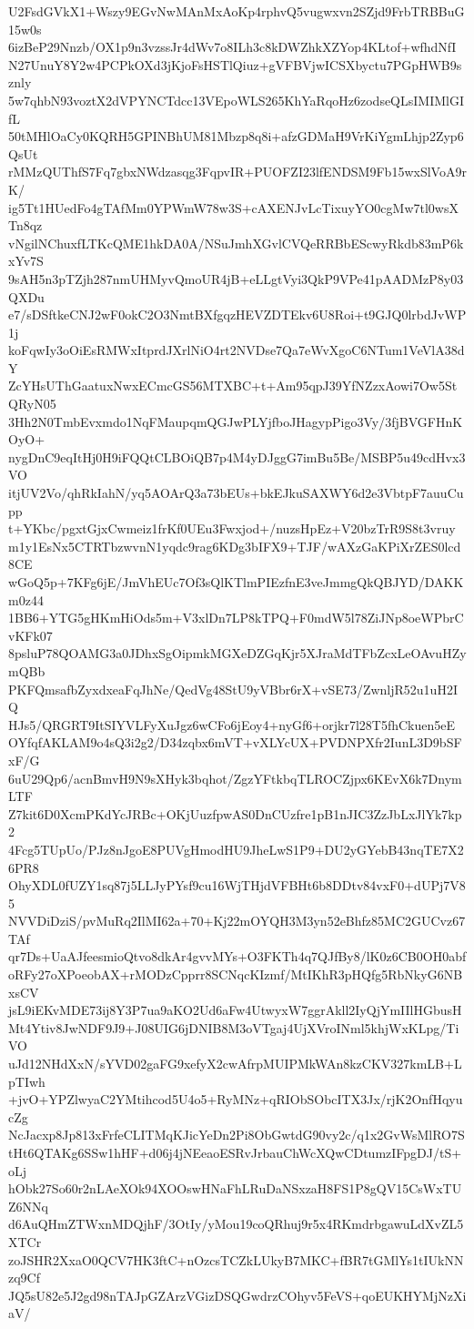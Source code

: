 U2FsdGVkX1+Wszy9EGvNwMAnMxAoKp4rphvQ5vugwxvn2SZjd9FrbTRBBuG15w0s
6izBeP29Nnzb/OX1p9n3vzssJr4dWv7o8ILh3c8kDWZhkXZYop4KLtof+wfhdNfI
N27UnuY8Y2w4PCPkOXd3jKjoFsHSTlQiuz+gVFBVjwICSXbyctu7PGpHWB9sznly
5w7qhbN93voztX2dVPYNCTdcc13VEpoWLS265KhYaRqoHz6zodseQLsIMIMlGIfL
50tMHlOaCy0KQRH5GPINBhUM81Mbzp8q8i+afzGDMaH9VrKiYgmLhjp2Zyp6QsUt
rMMzQUThfS7Fq7gbxNWdzasqg3FqpvIR+PUOFZI23lfENDSM9Fb15wxSlVoA9rK/
ig5Tt1HUedFo4gTAfMm0YPWmW78w3S+cAXENJvLcTixuyYO0cgMw7tl0wsXTn8qz
vNgilNChuxfLTKcQME1hkDA0A/NSuJmhXGvlCVQeRRBbEScwyRkdb83mP6kxYv7S
9sAH5n3pTZjh287nmUHMyvQmoUR4jB+eLLgtVyi3QkP9VPe41pAADMzP8y03QXDu
e7/sDSftkeCNJ2wF0okC2O3NmtBXfgqzHEVZDTEkv6U8Roi+t9GJQ0lrbdJvWP1j
koFqwIy3oOiEsRMWxItprdJXrlNiO4rt2NVDse7Qa7eWvXgoC6NTum1VeVlA38dY
ZcYHsUThGaatuxNwxECmcGS56MTXBC+t+Am95qpJ39YfNZzxAowi7Ow5StQRyN05
3Hh2N0TmbEvxmdo1NqFMaupqmQGJwPLYjfboJHagypPigo3Vy/3fjBVGFHnKOyO+
nygDnC9eqItHj0H9iFQQtCLBOiQB7p4M4yDJggG7imBu5Be/MSBP5u49cdHvx3VO
itjUV2Vo/qhRkIahN/yq5AOArQ3a73bEUs+bkEJkuSAXWY6d2e3VbtpF7auuCupp
t+YKbc/pgxtGjxCwmeiz1frKf0UEu3Fwxjod+/nuzsHpEz+V20bzTrR9S8t3vruy
m1y1EsNx5CTRTbzwvnN1yqdc9rag6KDg3bIFX9+TJF/wAXzGaKPiXrZES0lcd8CE
wGoQ5p+7KFg6jE/JmVhEUc7Of3sQlKTlmPIEzfnE3veJmmgQkQBJYD/DAKKm0z44
1BB6+YTG5gHKmHiOds5m+V3xlDn7LP8kTPQ+F0mdW5l78ZiJNp8oeWPbrCvKFk07
8psluP78QOAMG3a0JDhxSgOipmkMGXeDZGqKjr5XJraMdTFbZcxLeOAvuHZymQBb
PKFQmsafbZyxdxeaFqJhNe/QedVg48StU9yVBbr6rX+vSE73/ZwnljR52u1uH2IQ
HJs5/QRGRT9ItSIYVLFyXuJgz6wCFo6jEoy4+nyGf6+orjkr7l28T5fhCkuen5eE
OYfqfAKLAM9o4sQ3i2g2/D34zqbx6mVT+vXLYcUX+PVDNPXfr2IunL3D9bSFxF/G
6uU29Qp6/acnBmvH9N9sXHyk3bqhot/ZgzYFtkbqTLROCZjpx6KEvX6k7DnymLTF
Z7kit6D0XcmPKdYcJRBc+OKjUuzfpwAS0DnCUzfre1pB1nJIC3ZzJbLxJlYk7kp2
4Fcg5TUpUo/PJz8nJgoE8PUVgHmodHU9JheLwS1P9+DU2yGYebB43nqTE7X26PR8
OhyXDL0fUZY1sq87j5LLJyPYsf9cu16WjTHjdVFBHt6b8DDtv84vxF0+dUPj7V85
NVVDiDziS/pvMuRq2IlMI62a+70+Kj22mOYQH3M3yn52eBhfz85MC2GUCvz67TAf
qr7Ds+UaAJfeesmioQtvo8dkAr4gvvMYs+O3FKTh4q7QJfBy8/lK0z6CB0OH0abf
oRFy27oXPoeobAX+rMODzCpprr8SCNqcKIzmf/MtIKhR3pHQfg5RbNkyG6NBxsCV
jsL9iEKvMDE73ij8Y3P7ua9aKO2Ud6aFw4UtwyxW7ggrAkll2IyQjYmIIlHGbusH
Mt4Ytiv8JwNDF9J9+J08UIG6jDNIB8M3oVTgaj4UjXVroINml5khjWxKLpg/TiVO
uJd12NHdXxN/sYVD02gaFG9xefyX2cwAfrpMUIPMkWAn8kzCKV327kmLB+LpTIwh
+jvO+YPZlwyaC2YMtihcod5U4o5+RyMNz+qRIObSObcITX3Jx/rjK2OnfHqyucZg
NcJacxp8Jp813xFrfeCLITMqKJicYeDn2Pi8ObGwtdG90vy2c/q1x2GvWsMlRO7S
tHt6QTAKg6SSw1hHF+d06j4jNEeaoESRvJrbauChWcXQwCDtumzIFpgDJ/tS+oLj
hObk27So60r2nLAeXOk94XOOswHNaFhLRuDaNSxzaH8FS1P8gQV15CsWxTUZ6NNq
d6AuQHmZTWxnMDQjhF/3OtIy/yMou19coQRhuj9r5x4RKmdrbgawuLdXvZL5XTCr
zoJSHR2XxaO0QCV7HK3ftC+nOzcsTCZkLUkyB7MKC+fBR7tGMlYs1tIUkNNzq9Cf
JQ5sU82e5J2gd98nTAJpGZArzVGizDSQGwdrzCOhyv5FeVS+qoEUKHYMjNzXiaV/
